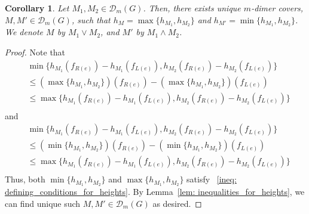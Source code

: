 \documentclass[11pt]{amsart}
\newtheorem{cor}[thm]{Corollary}
\theoremstyle{definition}
\theoremstyle{remark}
\numberwithin{equation}{section}
\begin{document}
\begin{cor}
    Let $M_1,M_2\in \mathcal{D}_m(G)$. Then, there exists unique $m$-dimer covers, $M,M'\in \mathcal{D}_m(G)$, such that $h_M = \max\{h_{M_1}, h_{M_2}\}$ and $h_{M'} = \min\{h_{M_1}, h_{M_2}\}$. We denote $M$ by $M_1\vee M_2$, and $M'$ by $M_1\wedge M_2$. 
\end{cor}
\begin{proof}
    Note that 
    \begin{equation}
        \begin{split}
            &\min\{h_{M_1}(f_{R(e)}) - h_{M_1}(f_{L(e)}), h_{M_2}(f_{R(e)}) - h_{M_2}(f_{L(e)})\}\\
            &\leq (\max\{h_{M_1}, h_{M_2}\})(f_{R(e)}) - (\max\{h_{M_1}, h_{M_2}\})(f_{L(e)})\\
            &\leq \max\{h_{M_1}(f_{R(e)}) - h_{M_1}(f_{L(e)}), h_{M_2}(f_{R(e)}) - h_{M_2}(f_{L(e)})\}\\
        \end{split}
    \end{equation}
    and 
    \begin{equation}
        \begin{split}
            &\min\{h_{M_1}(f_{R(e)}) - h_{M_1}(f_{L(e)}), h_{M_2}(f_{R(e)}) - h_{M_2}(f_{L(e)})\}\\
            &\leq (\min\{h_{M_1}, h_{M_2}\})(f_{R(e)}) - (\min\{h_{M_1}, h_{M_2}\})(f_{L(e)})\\
            &\leq \max\{h_{M_1}(f_{R(e)}) - h_{M_1}(f_{L(e)}), h_{M_2}(f_{R(e)}) - h_{M_2}(f_{L(e)})\}\\
        \end{split}
    \end{equation}
    Thus, both $\min\{h_{M_1}, h_{M_2}\}$ and $\max\{h_{M_1}, h_{M_2}\}$ satisfy ~\ref{ineq: defining_conditions_for_heights}. By Lemma~\ref{lem: inequalities_for_heights}, we can find unique such $M,M'\in \mathcal{D}_m(G)$ as desired.
\end{proof}
\end{document}
